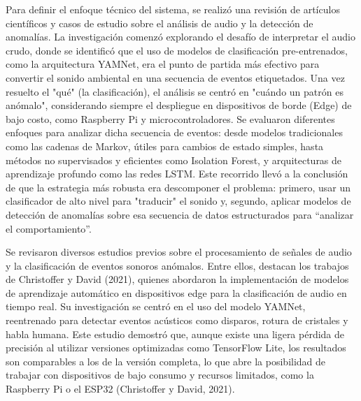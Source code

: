 

Para definir el enfoque técnico del sistema, se realizó una revisión de artículos científicos y casos de estudio sobre el análisis de audio y la detección de anomalías. La investigación comenzó explorando el desafío de interpretar el audio crudo, donde se identificó que el uso de modelos de clasificación pre-entrenados, como la arquitectura YAMNet, era el punto de partida más efectivo para convertir el sonido ambiental en una secuencia de eventos etiquetados. Una vez resuelto el "qué" (la clasificación), el análisis se centró en "cuándo un patrón es anómalo", considerando siempre el despliegue en dispositivos de borde (Edge) de bajo costo, como Raspberry Pi y microcontroladores. Se evaluaron diferentes enfoques para analizar dicha secuencia de eventos: desde modelos tradicionales como las cadenas de Markov, útiles para cambios de estado simples, hasta métodos no supervisados y eficientes como Isolation Forest, y arquitecturas de aprendizaje profundo como las redes LSTM. Este recorrido llevó a la conclusión de que la estrategia más robusta era descomponer el problema: primero, usar un clasificador de alto nivel para "traducir" el sonido y, segundo, aplicar modelos de detección de anomalías sobre esa secuencia de datos estructurados para ``analizar el comportamiento''.


Se revisaron diversos estudios previos sobre el procesamiento de señales de audio y la clasificación de eventos sonoros anómalos. Entre ellos, destacan los trabajos de Christoffer y David (2021), quienes abordaron la implementación de modelos de aprendizaje automático en dispositivos edge para la clasificación de audio en tiempo real. Su investigación se centró en el uso del modelo YAMNet, reentrenado para detectar eventos acústicos como disparos, rotura de cristales y habla humana. Este estudio demostró que, aunque existe una ligera pérdida de precisión al utilizar versiones optimizadas como TensorFlow Lite, los resultados son comparables a los de la versión completa, lo que abre la posibilidad de trabajar con dispositivos de bajo consumo y recursos limitados, como la Raspberry Pi o el ESP32 (Christoffer y David, 2021).


